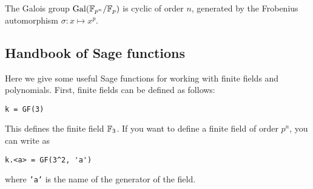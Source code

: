 \begin{theorem}
    The Galois group $\mathrm{Gal}(\mathbb{F}_{p^n} / \mathbb{F}_p)$ is cyclic of order $n$, generated by the Frobenius automorphism $\sigma: x \mapsto x^p$.
\end{theorem}



\newpage

\subsection{Handbook of Sage functions}
\label{subsec:handbook_sage}

Here we give some useful Sage functions for working with finite fields and polynomials.
First, finite fields can be defined as follows:
\begin{verbatim}
k = GF(3)
\end{verbatim}
This defines the finite field $\mathbb{F}_3$.
If you want to define a finite field of order $p^n$, you can write as
\begin{verbatim}
k.<a> = GF(3^2, 'a')
\end{verbatim}
where \texttt{'a'} is the name of the generator of the field.

